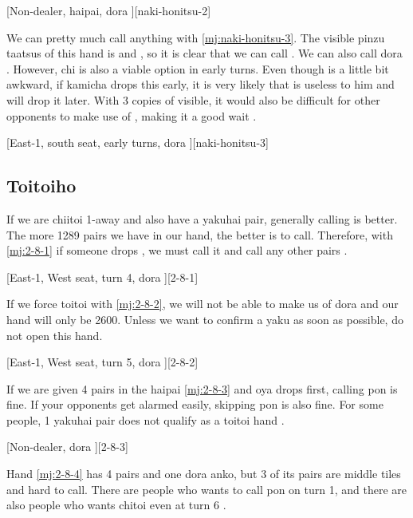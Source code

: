 \documentclass[12pt]{article}
\begin{document}
[Non-dealer, haipai, dora ][naki-honitsu-2]

We can pretty much call anything with \ref{mj:naki-honitsu-3}. The visible pinzu taatsus of this hand is  and , so it is clear that we can call . We can also call dora . However,  chi is also a viable option in early turns. Even though  is a little bit awkward, if kamicha drops  this early, it is very likely that  is useless to him and will drop it later. With 3 copies of  visible, it would also be difficult for other opponents to make use of , making it a good wait \citep[][pp.~121--123]{kawamura-naki}.

[East-1, south seat, early turns, dora ][naki-honitsu-3]


\subsection{Toitoiho}

If we are chiitoi 1-away and also have a yakuhai pair, generally calling is better. The more 1289 pairs we have in our hand, the better is to call. Therefore, with \ref{mj:2-8-1} if someone drops , we must call it and call any other pairs \citep[][pp.~204--211]{tetsusenryaku}.

[East-1, West seat, turn 4, dora ][2-8-1]

If we force toitoi with \ref{mj:2-8-2}, we will not be able to make us of dora  and our hand will only be 2600. Unless we want to confirm a yaku as soon as possible, do not open this hand.

[East-1, West seat, turn 5, dora ][2-8-2]

If we are given 4 pairs in the haipai \ref{mj:2-8-3} and oya drops  first, calling  pon is fine. If your opponents get alarmed easily, skipping pon is also fine. For some people, 1 yakuhai pair does not qualify as a toitoi hand \citep[][pp.~132--133, p~217]{fkt}.

[Non-dealer, dora ][2-8-3]

Hand \ref{mj:2-8-4} has 4 pairs and one dora anko, but 3 of its pairs are middle tiles and hard to call. There are people who wants to call  pon on turn 1, and there are also people who wants chitoi even at turn 6 \citep[][pp.~134--135, p.~217]{fkt}.
\end{document}
